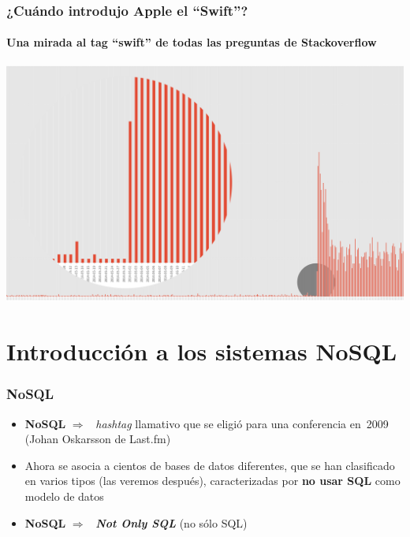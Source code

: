 \documentclass[14pt]{beamer}
\newcommand{\ra}{{\color{mdwrojo} $\Rightarrow${}~{}}}
\begin{document}
\begin{frame}
  \frametitle{¿Cuándo introdujo Apple el ``Swift''?}
  \framesubtitle{Una mirada al tag ``swift'' de todas las preguntas de
    Stackoverflow}
\includegraphics[width=\textwidth]{img/swift-tag}
\end{frame}




\section{Introducción a los sistemas NoSQL}

\begin{frame}
  \frametitle{NoSQL}
\begin{itemize}
\item {\bf NoSQL} \ra{} {\em hashtag\/} llamativo que se
  eligió para una conferencia en~2009 (Johan Oskarsson de Last.fm)
\item Ahora se asocia a cientos de bases de datos diferentes,
  que se han clasificado en varios tipos (las veremos después),
  caracterizadas por {\bf no usar SQL} como modelo de datos
\item {\bf NoSQL} \ra{} {\bfseries\itshape Not Only SQL} (no sólo SQL)
  \end{itemize}
\end{frame}
\end{document}

